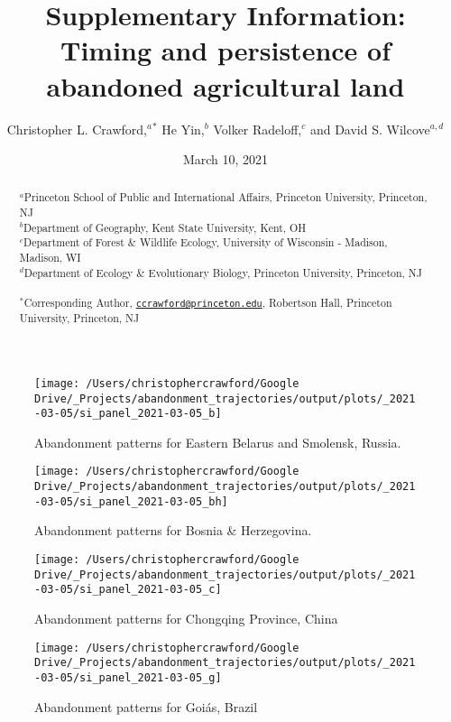\documentclass[
]{article}
\title{Supplementary Information: Timing and persistence of abandoned agricultural land}
\author{Christopher L. Crawford,\(^a\)\(^*\) He Yin,\(^b\) Volker Radeloff,\(^c\) and David S. Wilcove\(^{a, d}\)}
\date{March 10, 2021}
\begin{document}
\maketitle
\begin{abstract}
\(^a\)Princeton School of Public and International Affairs, Princeton University, Princeton, NJ\\
\(^b\)Department of Geography, Kent State University, Kent, OH\\
\(^c\)Department of Forest \& Wildlife Ecology, University of Wisconsin - Madison, Madison, WI\\
\(^d\)Department of Ecology \& Evolutionary Biology, Princeton University, Princeton, NJ\\
~\\
\(^*\)Corresponding Author, \href{mailto:ccrawford@princeton.edu}{\nolinkurl{ccrawford@princeton.edu}}, Robertson Hall, Princeton University, Princeton, NJ
\end{abstract}

{
\setcounter{tocdepth}{2}
\tableofcontents
}












\begin{figure}
\texttt{[image: /Users/christophercrawford/Google Drive/\_Projects/abandonment\_trajectories/output/plots/\_2021-03-05/si\_panel\_2021-03-05\_b]} \caption{Abandonment patterns for Eastern Belarus and Smolensk, Russia.}\label{fig:panel-b}
\end{figure}

\begin{figure}
\texttt{[image: /Users/christophercrawford/Google Drive/\_Projects/abandonment\_trajectories/output/plots/\_2021-03-05/si\_panel\_2021-03-05\_bh]} \caption{Abandonment patterns for Bosnia \& Herzegovina.}\label{fig:panel-bh}
\end{figure}

\begin{figure}
\texttt{[image: /Users/christophercrawford/Google Drive/\_Projects/abandonment\_trajectories/output/plots/\_2021-03-05/si\_panel\_2021-03-05\_c]} \caption{Abandonment patterns for Chongqing Province, China}\label{fig:panel-c}
\end{figure}

\begin{figure}
\texttt{[image: /Users/christophercrawford/Google Drive/\_Projects/abandonment\_trajectories/output/plots/\_2021-03-05/si\_panel\_2021-03-05\_g]} \caption{Abandonment patterns for Goiás, Brazil}\label{fig:panel-g}
\end{figure}
\end{document}
